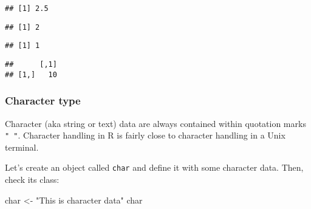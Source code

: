\documentclass[]{article}
\newenvironment{Shaded}{\begin{snugshade}}{\end{snugshade}}
\newcommand{\DecValTok}[1]{\textcolor[rgb]{0.00,0.00,0.81}{#1}}
\newcommand{\StringTok}[1]{\textcolor[rgb]{0.31,0.60,0.02}{#1}}
\newcommand{\OperatorTok}[1]{\textcolor[rgb]{0.81,0.36,0.00}{\textbf{#1}}}
\newcommand{\NormalTok}[1]{#1}
\begin{document}
\begin{verbatim}
## [1] 2.5
\end{verbatim}

\begin{Shaded}
\end{Shaded}

\begin{verbatim}
## [1] 2
\end{verbatim}

\begin{Shaded}
\end{Shaded}

\begin{verbatim}
## [1] 1
\end{verbatim}

\begin{Shaded}
\end{Shaded}

\begin{verbatim}
##      [,1]
## [1,]   10
\end{verbatim}

\subsubsection{Character type}\label{character-type}

Character (aka string or text) data are always contained within
quotation marks \texttt{"\ "}. Character handling in R is fairly close
to character handling in a Unix terminal.

Let's create an object called \texttt{char} and define it with some
character data. Then, check its class:

\begin{Shaded}
\begin{Highlighting}[]
\NormalTok{char <-}\StringTok{ "This is character data"}
\NormalTok{char}
\end{Highlighting}
\end{Shaded}
\end{document}
